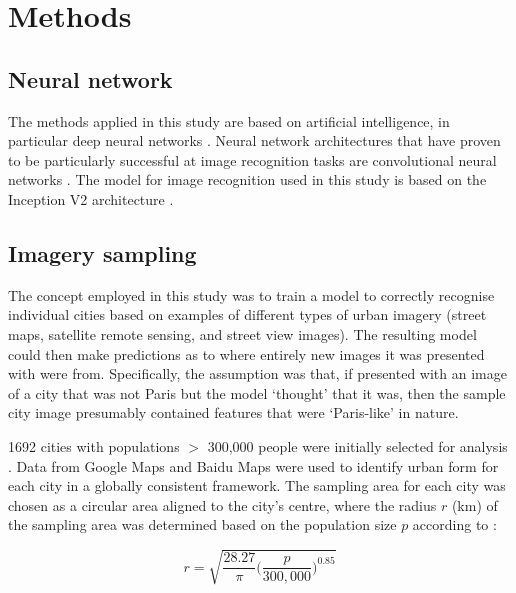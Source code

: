 \documentclass[Crown,sageh,times]{sagej}
\begin{document}
\section{Methods}\label{sec:methods}
\subsection{Neural network}\label{sec:methods1}

The methods applied in this study are based on artificial intelligence, in particular deep neural networks \citep{Bishop1995,Samarasinghe2016,Graupe2013}. Neural network architectures that have proven to be particularly successful at image recognition tasks are convolutional neural networks \citep{Schmidhuber2015}. The model for image recognition used in this study is based on the Inception V2 architecture \citep{Szegedy2015,Ioffe2015}. 



\subsection{Imagery sampling}\label{sec:methods2}

The concept employed in this study was to train a model to correctly recognise individual cities based on examples of different types of urban imagery (street maps, satellite remote sensing, and street view images). The resulting model could then make predictions as to where entirely new images it was presented with were from. Specifically, the assumption was that, if presented with an image of a city that was not Paris but the model `thought' that it was, then the sample city image presumably contained features that were `Paris-like' in nature. 

1692 cities with populations $>$ 300,000 people were initially selected for analysis \citep{UN2014}. Data from Google Maps and Baidu Maps were used to identify urban form for each city in a globally consistent framework. The sampling area for each city was chosen as a circular area aligned to the city's centre, where the radius $r$ (km) of the sampling area was determined based on the population size $p$ according to \citet{Barthelemy2016}: 

\begin{equation}
r = \sqrt{ \frac{28.27}{\pi} \bigg( \frac{p}{300,000}  \bigg)^{0.85} }
\end{equation}
\end{document}

